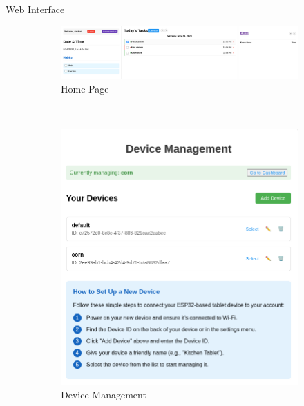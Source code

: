 \documentclass[final]{beamer}
\newlength{\colwidth}
\begin{document}
\begin{frame}[t]
\begin{columns}[t]
\begin{column}{\colwidth}
\begin{block}{Web Interface}
        \begin{figure}
          \begin{subfigure}{\textwidth}
            \includegraphics[width = \textwidth]{web_mainview.png}
            \caption{Home Page}
          \end{subfigure}
          \\
          \begin{subfigure}{0.49\textwidth}
            \includegraphics[width = \textwidth]{web_devices.png}
            \caption{Device Management}
          \end{subfigure}
          \hfill
          \begin{subfigure}{0.49\textwidth}

\end{subfigure}
\end{figure}
\end{block}
\end{column}
\end{columns}
\end{frame}
\end{document}
